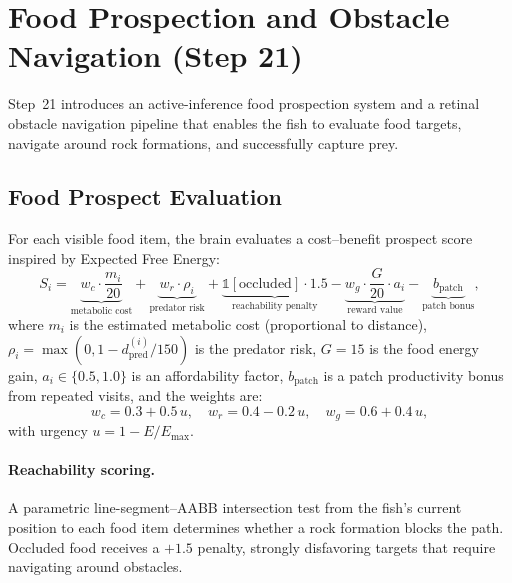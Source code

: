 \documentclass[11pt,a4paper]{article}
\begin{document}
\section{Food Prospection and Obstacle Navigation (Step 21)}\label{sec:prospect}

Step~21 introduces an active-inference food prospection system and a
retinal obstacle navigation pipeline that enables the fish to evaluate
food targets, navigate around rock formations, and successfully capture prey.

\subsection{Food Prospect Evaluation}

For each visible food item, the brain evaluates a cost--benefit
prospect score inspired by Expected Free Energy:
\begin{equation}\label{eq:prospect}
\boxed{
  S_i = \underbrace{w_c \cdot \frac{m_i}{20}}_\text{metabolic cost}
      + \underbrace{w_r \cdot \rho_i}_\text{predator risk}
      + \underbrace{\mathbb{1}[\text{occluded}] \cdot 1.5}_\text{reachability penalty}
      - \underbrace{w_g \cdot \frac{G}{20} \cdot a_i}_\text{reward value}
      - \underbrace{b_\text{patch}}_\text{patch bonus},
}
\end{equation}
where $m_i$ is the estimated metabolic cost (proportional to distance),
$\rho_i = \max(0, 1 - d_\text{pred}^{(i)}/150)$ is the predator risk,
$G = 15$ is the food energy gain,
$a_i \in \{0.5, 1.0\}$ is an affordability factor,
$b_\text{patch}$ is a patch productivity bonus from repeated visits,
and the weights are:
\begin{equation}\label{eq:prospect_weights}
  w_c = 0.3 + 0.5\,u, \quad
  w_r = 0.4 - 0.2\,u, \quad
  w_g = 0.6 + 0.4\,u,
\end{equation}
with urgency $u = 1 - E/E_\text{max}$.

\paragraph{Reachability scoring.}
A parametric line-segment--AABB intersection test from the fish's
current position to each food item determines whether a rock
formation blocks the path.
Occluded food receives a $+1.5$ penalty, strongly disfavoring
targets that require navigating around obstacles.
\end{document}

